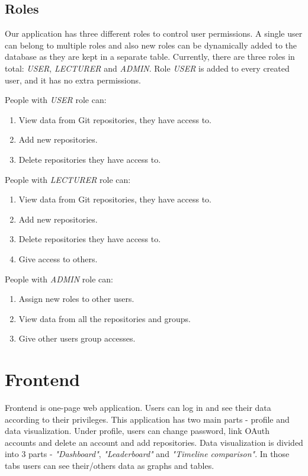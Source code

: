 \subsection{Roles}\label{subsec:roles}
Our application has three different roles to control user permissions.
A single user can belong to multiple roles and also new roles can be dynamically added to the database as they are
kept in a separate table.
Currently, there are three roles in total: \textit{USER}, \textit{LECTURER} and \textit{ADMIN}.
Role \textit{USER} is added to every created user, and it has no extra permissions.

People with \textit{USER} role can:
\begin{enumerate}
    \item View data from Git repositories, they have access to.
    \item Add new repositories.
    \item Delete repositories they have access to.
\end{enumerate}

People with \textit{LECTURER} role can:
\begin{enumerate}
    \item View data from Git repositories, they have access to.
    \item Add new repositories.
    \item Delete repositories they have access to.
    \item Give access to others.
\end{enumerate}

People with \textit{ADMIN} role can:
\begin{enumerate}
    \item Assign new roles to other users.
    \item View data from all the repositories and groups.
    \item Give other users group accesses.
\end{enumerate}

\section{Frontend}\label{sec:frontend-content}
Frontend is one-page web application.
Users can log in and see their data according to their privileges.
This application has two main parts - profile and data visualization.
Under profile, users can change password, link OAuth accounts and delete an account and add repositories.
Data visualization is divided into 3 parts - \textit{"Dashboard"}, \textit{"Leaderboard"} and \textit{"Timeline comparison"}.
In those tabs users can see their/others data as graphs and tables.

